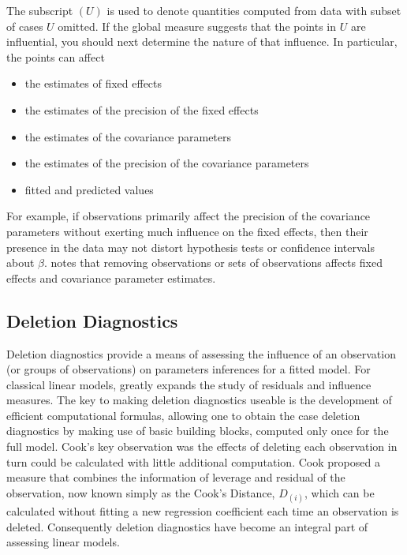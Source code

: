 \documentclass[12pt, a4paper]{report}
\theoremstyle{plain}
\theoremstyle{definition}
\theoremstyle{remark}
\begin{document}
The subscript $(U)$ is used to denote quantities computed from data with subset of cases $U$ omitted.
If the global measure suggests that the points in $U$ are influential, you should next determine the nature of
that influence. In particular, the points can affect
\begin{itemize}
	\item the estimates of fixed effects
	\item the estimates of the precision of the fixed effects
	\item the estimates of the covariance parameters
	\item the estimates of the precision of the covariance parameters
	\item fitted and predicted values
\end{itemize}	

For example, if observations primarily affect the precision of the covariance parameters without exerting much influence on the fixed effects, then their presence in the data may not distort hypothesis
tests or confidence intervals about $\beta$. 
\citet{schabenberger} notes that removing observations or sets of observations affects fixed effects and covariance parameter estimates.





\newpage

	\subsection{Deletion Diagnostics}
	
	
	
	Deletion diagnostics provide a means of assessing the influence of an observation (or groups of observations) on parameters inferences for a fitted model. For classical linear models, \citet{cook77} greatly expands the study of residuals and influence measures. The key to making deletion diagnostics useable is the development of efficient computational formulas, allowing one to obtain the  case deletion diagnostics by making use of basic building blocks, computed only once for the full model.
	Cook's key observation was the effects of deleting each observation in turn could be calculated with little additional computation. Cook proposed a measure that combines the information of leverage and residual of the observation, now known simply as the Cook's Distance, $D_{(i)}$, which can be calculated without fitting a new regression coefficient each time an observation is deleted. Consequently deletion diagnostics have become an integral part of assessing linear models.
	
\end{document}
